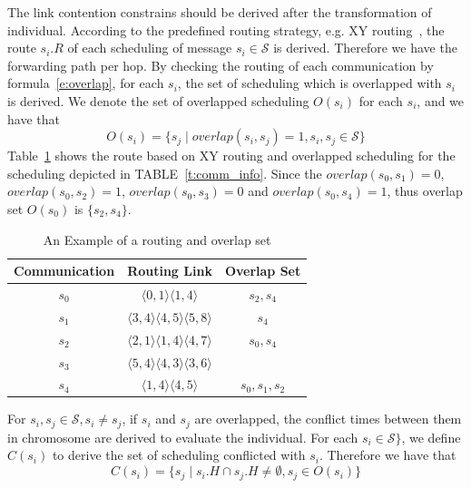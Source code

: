 \documentclass[journal]{IEEEtran}
\newcommand{\calS}{\mathcal{S}}
\begin{document}
The link contention constrains should be derived after the transformation of individual.
According to the predefined routing strategy,
 e.g. XY routing~\cite{DBLP:books/daglib/0087651},
  the route $s_i.R$ of each scheduling of message $s_i\in \calS$ is derived.
Therefore we have the forwarding path per hop.
By checking the routing of each communication by formula~\ref{e:overlap},
 for each $s_i$,
 the set of scheduling which is overlapped with $s_i$ is derived.
We denote the set of overlapped scheduling $O(s_i)$ for each $s_i$,
and we have that
\begin{equation}
	O(s_i) = \{ s_j \mid overlap(s_i,s_j)=1,s_i,s_j\in \calS  \}
\end{equation}
Table~\ref{t:overlap} shows the route based on XY routing and overlapped scheduling for the scheduling depicted in TABLE~\ref{t:comm_info}.
Since the $overlap(s_{0},s_{1})=0$, $overlap(s_{0},s_{2})=1$, $overlap(s_{0},s_{3})=0$ and $overlap(s_{0},s_{4})=1$, thus overlap set $O(s_{0})$ is $\{ s_{2},s_{4} \}$. 

\begin{table}[!t]
	\renewcommand{\arraystretch}{1.3}
	\caption{An Example of a routing and overlap set}
	\label{t:overlap}
	\centering
	\begin{tabular}{|c||c||c|}
		\hline
		\textbf{Communication} & \textbf{Routing Link}& \textbf{Overlap Set}\\
		\hline
		$s_{0}$ & $ \langle 0,1\rangle\langle 1,4\rangle$ 		& $s_{2},s_{4}$ \\
		\hline
		$s_{1}$ & $ \langle 3,4\rangle\langle 4,5\rangle\langle 5,8\rangle$	& $s_{4}$ \\
		\hline
		$s_{2}$ & $ \langle 2,1\rangle\langle 1,4\rangle\langle 4,7\rangle$ 	& $s_{0},s_{4}$ \\
		\hline		
		$s_{3}$ & $ \langle 5,4\rangle\langle 4,3\rangle\langle 3,6\rangle$ 	& \\
		\hline
		$s_{4}$ & $ \langle 1,4\rangle\langle 4,5\rangle$ 		& $s_{0},s_{1},s_{2}$ \\
		\hline		
	\end{tabular}
\end{table}

For $s_{i},s_{j}\in \calS, s_{i}\neq s_{j}$,
if $s_i$ and $s_j$ are overlapped,
the conflict times between them in chromosome are derived to evaluate the individual.
For each $s_{i}\in \calS\}$,
 we define $C(s_{i})$ to derive the set of scheduling conflicted with $s_{i}$. Therefore we have that
\begin{equation}
	C(s_i) = \{ s_j \mid s_i.H \cap s_j.H \neq \emptyset  ,s_j\in O(s_i) \}
\end{equation}
   
\end{document}

